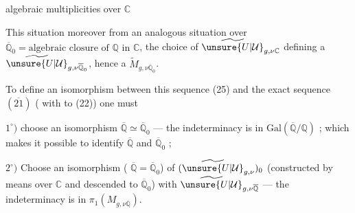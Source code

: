 

algebraic multiplicities over $\mathbb C$


This situation moreover   from an analogous situation over $\overline{\mathbb Q}_0=\text{algebraic closure of }\mathbb Q\text{ in }\mathbb C$, the choice of $\widetilde{\unsure{U|\mathcal{U}}}_{g,\nu\mathbb C}$ defining a $\widetilde{\unsure{U|\mathcal{U}}}_{g,\nu\overline{\mathbb Q}_0}$, hence a $\widetilde{M}_{g,\nu\overline{\mathbb Q}_0}$.

To define an isomorphism between this sequence (25) and the exact sequence $(\overline{21})$  ( with  to (22)) one must

$1^{\circ})$ choose an isomorphism $\overline{\mathbb Q}\simeq\overline{\mathbb Q}_0$ --- the indeterminacy is in $\mathrm{Gal}(\overline{\mathbb Q}/\mathbb Q)$ ; which makes it possible to identify $\overline{\mathbb Q}$ and $\overline{\mathbb Q}_0$ ;

$2^{\circ})$ Choose an isomorphism ( $\overline{\mathbb Q}=\overline{\mathbb Q}_0$) of $(\widetilde{\unsure{U|\mathcal{U}}}_{g,\nu})_0$ (constructed by  means over $\mathbb C$ and descended to $\overline{\mathbb Q}_0$) with $\widetilde{\unsure{U|\mathcal{U}}}_{g,\nu\overline{\mathbb Q}}$ --- the indeterminacy is in $\pi_1(M_{g,\nu\overline{\mathbb Q}})$.

